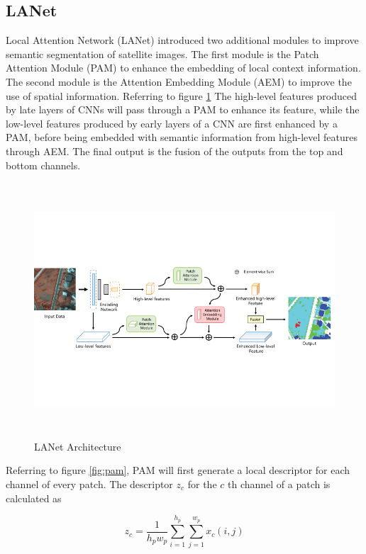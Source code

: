\subsection{LANet}
Local Attention Network (LANet) \cite{lanet}introduced two additional modules to improve semantic segmentation of satellite images. The first module is the Patch Attention Module (PAM) to enhance the embedding of local context information. The second module is the Attention Embedding Module (AEM) to improve the use of spatial information. Referring to figure \ref{fig:lanet} The high-level features produced by late layers of CNNs will pass through a PAM to enhance its feature, while the low-level features produced by early layers of a CNN are first enhanced by a PAM, before being embedded with semantic information from high-level features through AEM. The final output is the fusion of the outputs from the top and bottom channels. 

\FloatBarrier
\begin{figure}[ht]
\includegraphics[width=12.5cm, height=9.5cm]{images/lanet.png}
\centering
\caption{LANet Architecture \protect\cite{lanet}}
\label{fig:lanet}
\end{figure}

\FloatBarrier

Referring to figure \ref{fig:pam}, PAM will first generate a local descriptor for each channel of every patch. The descriptor $z_c$ for the $c$ th channel of a patch is calculated as

\begin{equation}
    z_c = \frac{1}{h_p w_p} \sum_{i=1}^{h_p} \sum_{j=1}^{w_p} x_c(i,j)
\end{equation}

